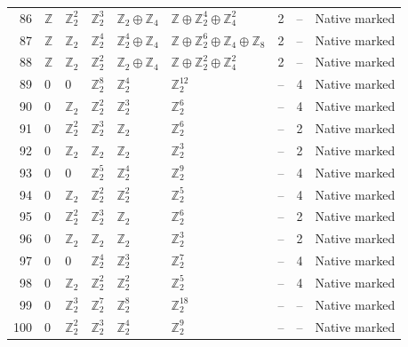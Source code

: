 \documentclass[10pt]{article}
\begin{document}
\begin{longtable}{r|lllll|rrl}
86 & $\mathbb{Z}$ & $\mathbb{Z}_{2}^{2}$ & $\mathbb{Z}_{2}^{3}$ & $\mathbb{Z}_{2}\oplus \mathbb{Z}_{4}$ & $\mathbb{Z}\oplus \mathbb{Z}_{2}^{4}\oplus \mathbb{Z}_{4}^{2}$ & 2 & -- & Native marked\\
87 & $\mathbb{Z}$ & $\mathbb{Z}_{2}$ & $\mathbb{Z}_{2}^{4}$ & $\mathbb{Z}_{2}^{4}\oplus \mathbb{Z}_{4}$ & $\mathbb{Z}\oplus \mathbb{Z}_{2}^{6}\oplus \mathbb{Z}_{4}\oplus \mathbb{Z}_{8}$ & 2 & -- & Native marked\\
88 & $\mathbb{Z}$ & $\mathbb{Z}_{2}$ & $\mathbb{Z}_{2}^{2}$ & $\mathbb{Z}_{2}\oplus \mathbb{Z}_{4}$ & $\mathbb{Z}\oplus \mathbb{Z}_{2}^{2}\oplus \mathbb{Z}_{4}^{2}$ & 2 & -- & Native marked\\
89 & $0$ & $0$ & $\mathbb{Z}_{2}^{8}$ & $\mathbb{Z}_{2}^{4}$ & $\mathbb{Z}_{2}^{12}$ & -- & 4 & Native marked\\
90 & $0$ & $\mathbb{Z}_{2}$ & $\mathbb{Z}_{2}^{2}$ & $\mathbb{Z}_{2}^{3}$ & $\mathbb{Z}_{2}^{6}$ & -- & 4 & Native marked\\
91 & $0$ & $\mathbb{Z}_{2}^{2}$ & $\mathbb{Z}_{2}^{3}$ & $\mathbb{Z}_{2}$ & $\mathbb{Z}_{2}^{6}$ & -- & 2 & Native marked\\
92 & $0$ & $\mathbb{Z}_{2}$ & $\mathbb{Z}_{2}$ & $\mathbb{Z}_{2}$ & $\mathbb{Z}_{2}^{3}$ & -- & 2 & Native marked\\
93 & $0$ & $0$ & $\mathbb{Z}_{2}^{5}$ & $\mathbb{Z}_{2}^{4}$ & $\mathbb{Z}_{2}^{9}$ & -- & 4 & Native marked\\
94 & $0$ & $\mathbb{Z}_{2}$ & $\mathbb{Z}_{2}^{2}$ & $\mathbb{Z}_{2}^{2}$ & $\mathbb{Z}_{2}^{5}$ & -- & 4 & Native marked\\
95 & $0$ & $\mathbb{Z}_{2}^{2}$ & $\mathbb{Z}_{2}^{3}$ & $\mathbb{Z}_{2}$ & $\mathbb{Z}_{2}^{6}$ & -- & 2 & Native marked\\
96 & $0$ & $\mathbb{Z}_{2}$ & $\mathbb{Z}_{2}$ & $\mathbb{Z}_{2}$ & $\mathbb{Z}_{2}^{3}$ & -- & 2 & Native marked\\
97 & $0$ & $0$ & $\mathbb{Z}_{2}^{4}$ & $\mathbb{Z}_{2}^{3}$ & $\mathbb{Z}_{2}^{7}$ & -- & 4 & Native marked\\
98 & $0$ & $\mathbb{Z}_{2}$ & $\mathbb{Z}_{2}^{2}$ & $\mathbb{Z}_{2}^{2}$ & $\mathbb{Z}_{2}^{5}$ & -- & 4 & Native marked\\
99 & $0$ & $\mathbb{Z}_{2}^{3}$ & $\mathbb{Z}_{2}^{7}$ & $\mathbb{Z}_{2}^{8}$ & $\mathbb{Z}_{2}^{18}$ & -- & -- & Native marked\\
100 & $0$ & $\mathbb{Z}_{2}^{2}$ & $\mathbb{Z}_{2}^{3}$ & $\mathbb{Z}_{2}^{4}$ & $\mathbb{Z}_{2}^{9}$ & -- & -- & Native marked\\

\end{longtable}
\end{document}
